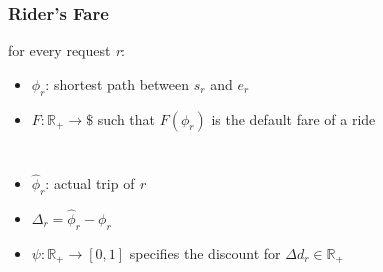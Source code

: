 \documentclass[t]{beamer}
\begin{document}
\begin{frame}\frametitle{Rider's Fare}
for every request \textit{r}:
\begin{itemize}
\item<1-> $\phi_r$: shortest path between $s_r$ and $e_r$
\item<2-> $F: \mathbb{R}_{+}  \rightarrow \$ $ such that $F(\phi_r)$ is the default fare of a ride
\end{itemize}
\begin{columns}
\begin{itemize}
\item<3-> $\hat{\phi}_r$: actual trip of \textit{r}
\item<3-> $\Delta_r = \hat{\phi}_r - \phi_r$
\item<4-> $\psi: \mathbb{R}_{+} \rightarrow \left[ 0, 1 \right] $ specifies the discount for $\Delta d_r \in \mathbb{R}_{+}$
\end{itemize}
\vspace{0.25in}

\end{columns}
\end{frame}
\end{document}
